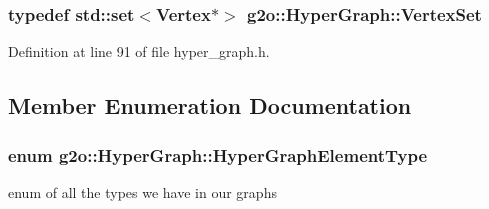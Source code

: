 \subsubsection[{\texorpdfstring{Vertex\+Set}{VertexSet}}]{\setlength{\rightskip}{0pt plus 5cm}typedef std\+::set$<${\bf Vertex}$\ast$$>$ {\bf g2o\+::\+Hyper\+Graph\+::\+Vertex\+Set}}\hypertarget{classg2o_1_1HyperGraph_a703938cdb4bb636860eed55a2489d70c}{}\label{classg2o_1_1HyperGraph_a703938cdb4bb636860eed55a2489d70c}


Definition at line 91 of file hyper\+\_\+graph.\+h.



\subsection{Member Enumeration Documentation}
\subsubsection[{\texorpdfstring{Hyper\+Graph\+Element\+Type}{HyperGraphElementType}}]{\setlength{\rightskip}{0pt plus 5cm}enum {\bf g2o\+::\+Hyper\+Graph\+::\+Hyper\+Graph\+Element\+Type}}\hypertarget{classg2o_1_1HyperGraph_af603119d5d3475aed6e34ee9d701b69e}{}\label{classg2o_1_1HyperGraph_af603119d5d3475aed6e34ee9d701b69e}


enum of all the types we have in our graphs 

